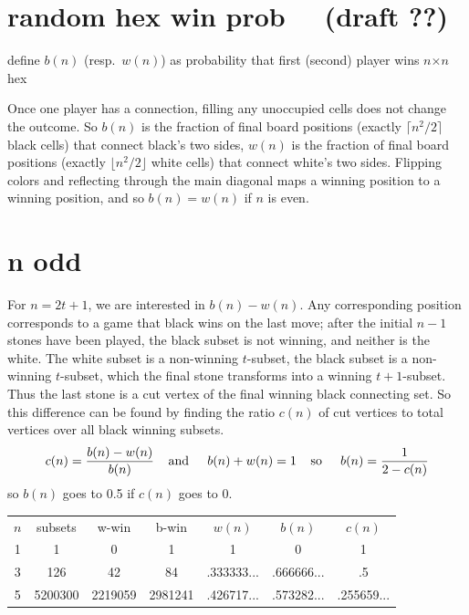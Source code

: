 \documentclass[12pt]{article}
\begin{document}
\section{random hex win prob \ \ (draft ??)}
define $b(n)$ (resp.\ $w(n)$)
as probability that first (second) player wins $n$$\times$$n$ hex

Once one player has a connection, filling any unoccupied cells
does not change the outcome.
So $b(n)$ is the fraction
of final board positions (exactly $\lceil n^2/2 \rceil$ black cells)
that connect black's two sides, 
$w(n)$ is the fraction
of final board positions (exactly $\lfloor n^2/2 \rfloor$ white cells)
that connect white's two sides.
Flipping colors and reflecting through the main
diagonal maps a winning position to a winning position,
and so $b(n)=w(n)$ if $n$ is even.

\section{n odd}
For $n=2t+1$, we are interested in $b(n)-w(n)$.
Any corresponding position corresponds 
to a game that black wins on the last move;
after the initial $n-1$ stones have been played, the
black subset is not winning, and neither is the white.
The white subset is a non-winning $t$-subset,
the black subset is a non-winning $t$-subset,
which the final stone transforms into a winning $t+1$-subset.
Thus the last stone is a cut vertex of the final winning
black connecting set.
So this difference can be found by finding the 
ratio $c(n)$ of cut vertices to total vertices over
all black winning subsets.
\[ c(n) = \frac{b(n)-w(n)}{b(n)} 
\: \: \: \: \: \mbox{\rm and } \: \: \: \: \:  
b(n) + w(n) = 1
\: \: \: \: \: \mbox{\rm so }  \: \: \: \: \: 
b(n) = \frac{1}{2 - c(n)}\] 
so $b(n)$ goes to 0.5 if $c(n)$ goes to 0.

\vfill


\begin{tabular}{ccccccc}
$n$ & subsets & w-win & b-win & $w(n)$ & $b(n)$ & $c(n)$ \\
1   &  1      &  0    & 1     & 1         & 0     &  1     \\
3   &  126    & 42    & 84    & .333333... & .666666... & .5 \\
5   &  5200300 &  2219059 & 2981241 & .426717... & .573282... & .255659... 
\end{tabular}

\vfill
\end{document}
